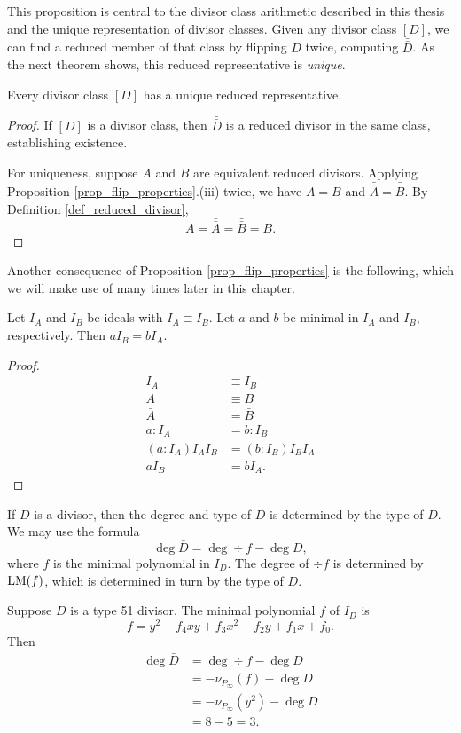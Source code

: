 This proposition is central to the divisor class arithmetic described in this thesis
and the unique representation of divisor classes.
Given any divisor class $[D]$, we can find a reduced member of that class by
flipping $D$ twice, computing $\bar{\bar D}$. As the next theorem shows,
this reduced representative is \emph{unique}.

\begin{theorem}
  Every divisor class $[D]$ has a unique reduced representative.
\end{theorem}
\begin{proof}
  If $[D]$ is a divisor class, then $\bar{\bar D}$ is a reduced divisor in the same class,
  establishing existence.
  
  For uniqueness, suppose $A$ and $B$ are equivalent reduced divisors.
  Applying Proposition \ref{prop_flip_properties}.(iii) twice,
  we have $\bar A = \bar B$ and $\bar{\bar A} = \bar{\bar B}$.
  By Definition \ref{def_reduced_divisor},
    \[ A = \bar{\bar A} = \bar{\bar B} = B. \]
\end{proof}

Another consequence of Proposition \ref{prop_flip_properties} is the following,
which we will make use of many times later in this chapter.
\begin{proposition}
  \label{prop_aI_B_is_bI_A}
  Let $I_A$ and $I_B$ be ideals with $I_A \equiv I_B$.
  Let $a$ and $b$ be minimal in $I_A$ and $I_B$, respectively.
  Then $aI_B = bI_A$.
\end{proposition}
\begin{proof}
  \begin{align*}
    I_A &\equiv I_B \\
    A &\equiv B \\
    \bar A &= \bar B \\
    a : I_A &= b : I_B \\
    (a : I_A)I_AI_B &= (b : I_B)I_BI_A \\
    aI_B &= bI_A.
  \end{align*}
\end{proof}

If $D$ is a divisor, then the degree and type of $\bar D$ is determined by the type of $D$.
We may use the formula
\begin{equation}
  \label{eq_flip_degree}
  \deg \bar D = \deg \div f - \deg D,
\end{equation}
where $f$ is the minimal polynomial in $I_D$. The degree of $\div f$ is determined by $\operatorname{LM}(f)$,
which is determined in turn by the type of $D$.
\begin{example}
  Suppose $D$ is a type 51 divisor.
  The minimal polynomial $f$ of $I_D$ is
  \[ f = y^2 + f_4xy + f_3x^2 + f_2y + f_1x + f_0. \]
  Then
  \begin{align*}
    \deg \bar D &= \deg \div f - \deg D \\
                &= -\nu_{P_\infty}(f) - \deg D \\
                &= -\nu_{P_\infty}(y^2) - \deg D \\
                &= 8 - 5 = 3.
  \end{align*}
\end{example}

